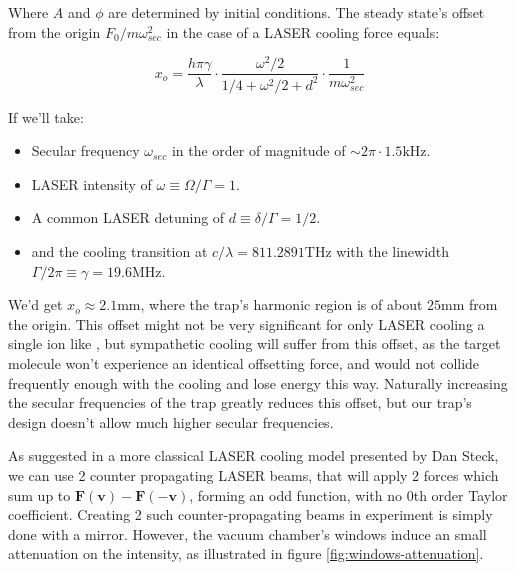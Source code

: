 Where $A$ and $\phi$ are determined by initial conditions. The steady state's offset from the origin $F_0/m\omega_{sec}^2$ in the case of a LASER cooling force equals:

\begin{equation}
x_o = \frac{h \pi \gamma}{\lambda}\cdot\frac{\omega^2/2}{1/4+\omega^2/2 + d^2} \cdot\frac{1}{m \omega_{sec}^2}
\end{equation}

If we'll take:

\begin{itemize}
	\item Secular frequency $\omega_{sec}$ in the order of magnitude of $\sim 2\pi\cdot 1.5\mathrm{kHz}$.
	\item LASER intensity of $\omega \equiv \Omega/\Gamma = 1$. %
	\item A common LASER detuning of $d \equiv \delta/\Gamma = 1/2$. %
	\item {} and the cooling transition at $c/\lambda = 811.2891 \mathrm{THz}$ with the linewidth $\Gamma/2\pi \equiv \gamma = 19.6 \mathrm{MHz}$. %
\end{itemize}

We'd get $x_o \approx 2.1 \mathrm{mm}$, where the trap's harmonic region is of about $25 \mathrm{mm}$ from the origin. This offset might not be very significant for only LASER cooling a single ion like , but sympathetic cooling will suffer from this offset, as the target molecule won't experience an identical offsetting force, and would not collide frequently enough with the cooling and lose energy this way. Naturally increasing the secular frequencies of the trap greatly reduces this offset, but our trap's design doesn't allow much higher secular frequencies.


As suggested in a more classical LASER cooling model presented by Dan Steck\cite{SteckClassicalCooling}, we can use 2 counter propagating LASER beams, that will apply 2 forces which sum up to $\mathbf{F}(\mathbf{v}) - \mathbf{F}(-\mathbf{v})$, forming an odd function, with no 0th order Taylor coefficient. Creating 2 such counter-propagating beams in experiment is simply done with a mirror. However, the vacuum chamber's windows induce an small attenuation on the intensity, as illustrated in figure \ref{fig:windows-attenuation}.


